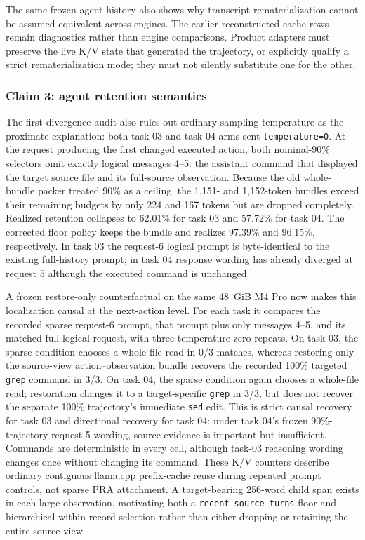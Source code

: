 \documentclass[11pt]{article}
\begin{document}
The same frozen agent history also shows why transcript rematerialization
cannot be assumed equivalent across engines.  The earlier reconstructed-cache
rows remain diagnostics rather than engine comparisons.  Product adapters must
preserve the live K/V state that generated the trajectory, or explicitly
qualify a strict rematerialization mode; they must not silently substitute one
for the other.

\subsubsection{Claim 3: agent retention semantics}

The first-divergence audit also rules out ordinary sampling temperature as the
proximate explanation: both task-03 and task-04 arms sent
\texttt{temperature=0}.  At the request producing the first changed executed
action, both nominal-90\% selectors omit exactly logical messages 4--5: the
assistant command that displayed the target source file and its full-source
observation.  Because the old whole-bundle packer treated 90\% as a ceiling,
the 1,151- and 1,152-token bundles exceed their remaining budgets by only 224
and 167 tokens but are dropped completely.  Realized retention collapses to
62.01\% for task 03 and 57.72\% for task 04.  The corrected floor policy keeps
the bundle and realizes 97.39\% and 96.15\%, respectively.  In task 03 the
request-6 logical prompt is byte-identical to the existing full-history prompt;
in task 04 response wording has already diverged at request 5 although the
executed command is unchanged.

A frozen restore-only counterfactual on the same 48~GiB M4 Pro now makes this
localization causal at the next-action level.  For each task it compares the
recorded sparse request-6 prompt, that prompt plus only messages 4--5, and its
matched full logical request, with three temperature-zero repeats.  On task 03,
the sparse condition chooses a whole-file read in 0/3 matches, whereas restoring
only the source-view action--observation bundle recovers the recorded 100\%
targeted \texttt{grep} command in 3/3.  On task 04, the sparse condition again
chooses a whole-file read; restoration changes it to a target-specific
\texttt{grep} in 3/3, but does not recover the separate 100\% trajectory's
immediate \texttt{sed} edit.  This is strict causal recovery for task 03 and
directional recovery for task 04: under task 04's frozen 90\%-trajectory
request-5 wording, source evidence is important but insufficient.  Commands
are deterministic in every cell, although task-03 reasoning wording changes
once without changing its command.  These K/V counters describe ordinary
contiguous llama.cpp prefix-cache reuse during repeated prompt controls, not
sparse PRA attachment.  A target-bearing 256-word child span exists in each
large observation, motivating both a \texttt{recent\_source\_turns} floor and
hierarchical within-record selection rather than either dropping or retaining
the entire source view.
\end{document}
